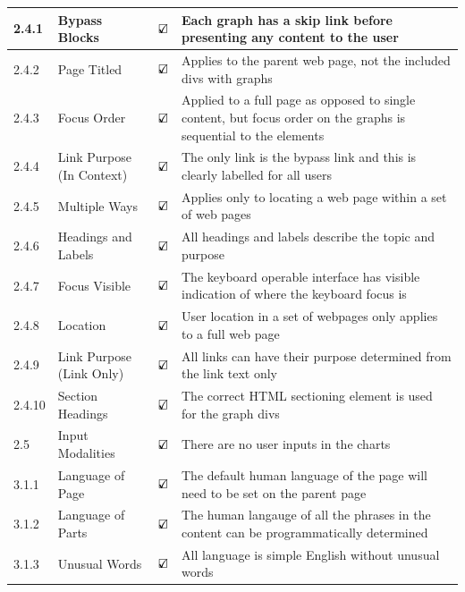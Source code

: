 \documentclass[ %
                    author={Aleena Baig},
                supervisor={Dr Simon Lock},
                    degree={BSc},
                     title={On Making Web Accessible Graphs},
                  subtitle={},
                      year={2019} ]{dissertation}
\begin{document}
\begin{center}
\begin{longtable}{|p{2cm}|p{5cm}|p{2cm}|p{5cm}|}
 \hline
 2.4.1 & Bypass Blocks & $\text{\rlap{$\checkmark$}}\square$ & Each graph has a skip link before presenting any content to the user\\
 \hline
 2.4.2 & Page Titled & $\text{\rlap{$\checkmark$}}\square$ & Applies to the parent web page, not the included divs with graphs\\
 \hline
 2.4.3 & Focus Order & $\text{\rlap{$\checkmark$}}\square$ & Applied to a full page as opposed to single content, but focus order on the graphs is sequential to the elements\\
 \hline
 2.4.4 & Link Purpose (In Context) & $\text{\rlap{$\checkmark$}}\square$ & The only link is the bypass link and this is clearly labelled for all users\\
 \hline
 2.4.5 & Multiple Ways & $\text{\rlap{$\checkmark$}}\square$ & Applies only to locating a web page within a set of web pages\\
 \hline
 2.4.6 & Headings and Labels & $\text{\rlap{$\checkmark$}}\square$ & All headings and labels describe the topic and purpose\\
 \hline
 2.4.7 & Focus Visible & $\text{\rlap{$\checkmark$}}\square$ & The keyboard operable interface has visible indication of where the keyboard focus is\\
 \hline
 2.4.8 & Location & $\text{\rlap{$\checkmark$}}\square$ & User location in a set of webpages only applies to a full web page\\
 \hline
 2.4.9 & Link Purpose (Link Only) & $\text{\rlap{$\checkmark$}}\square$ & All links can have their purpose determined from the link text only\\
 \hline
 2.4.10 & Section Headings & $\text{\rlap{$\checkmark$}}\square$ & The correct HTML sectioning element is used for the graph divs\\
 \hline
 2.5 & Input Modalities & $\text{\rlap{$\checkmark$}}\square$ & There are no user inputs in the charts\\
 \hline
 3.1.1 & Language of Page & $\text{\rlap{$\checkmark$}}\square$ & The default human language of the page will need to be set on the parent page\\
 \hline
 3.1.2 & Language of Parts & $\text{\rlap{$\checkmark$}}\square$ & The human langauge of all the phrases in the content can be programmatically determined\\
 \hline
 3.1.3 & Unusual Words & $\text{\rlap{$\checkmark$}}\square$ & All language is simple English without unusual words\\
 \hline

\end{longtable}
\end{center}
\end{document}
